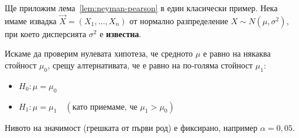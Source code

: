\begin{example}
Ще приложим\label{ex:13-1} лема~\ref{lem:neyman-pearson} в един класически пример. Нека имаме извадка $\vec{X} = (X_1, \dots, X_n)$ от нормално разпределение $X \sim N(\mu, \sigma^2)$, при което дисперсията $\sigma^2$ е \textbf{известна}.

Искаме да проверим нулевата хипотеза, че средното $\mu$ е равно на някаква стойност $\mu_0$, срещу алтернативата, че е равно на по-голяма стойност $\mu_1$:
\begin{itemize}
    \item $H_0: \mu = \mu_0$
    \item $H_1: \mu = \mu_1 \quad (\text{като приемаме, че } \mu_1 > \mu_0)$
\end{itemize}
Нивото на значимост (грешката от първи род) е фиксирано, например $\alpha = 0{,}05$.


\end{example}
